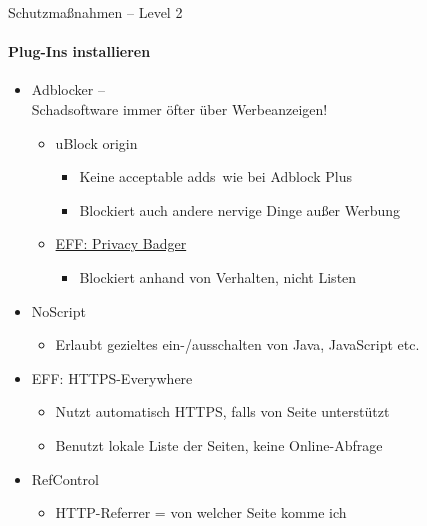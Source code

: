 \begin{frame}{Schutzmaßnahmen -- Level 2}
\framesubtitle{Plug-Ins installieren}
  \begin{itemize}
    \item Adblocker --\\ Schadsoftware immer öfter über Werbeanzeigen!
    \begin{itemize}
      \item uBlock origin
      \begin{itemize}
        \item Keine \glqq acceptable adds\grqq\ wie bei Adblock Plus
        \item Blockiert auch andere nervige Dinge außer Werbung
      \end{itemize}
      \item \href{https://www.eff.org/privacybadger}{EFF: Privacy Badger}
      \begin{itemize}
        \item Blockiert anhand von Verhalten, nicht Listen
      \end{itemize}
    \end{itemize}
    \item NoScript
    \begin{itemize}
      \item Erlaubt gezieltes ein-/ausschalten von Java, JavaScript etc.
    \end{itemize}
    \item EFF: HTTPS-Everywhere
    \begin{itemize}
      \item Nutzt automatisch HTTPS, falls von Seite unterstützt
      \item Benutzt lokale Liste der Seiten, keine Online-Abfrage
    \end{itemize}
    \item RefControl
    \begin{itemize}
      \item HTTP-Referrer = von welcher Seite komme ich
    \end{itemize}
  \end{itemize}
\end{frame}

